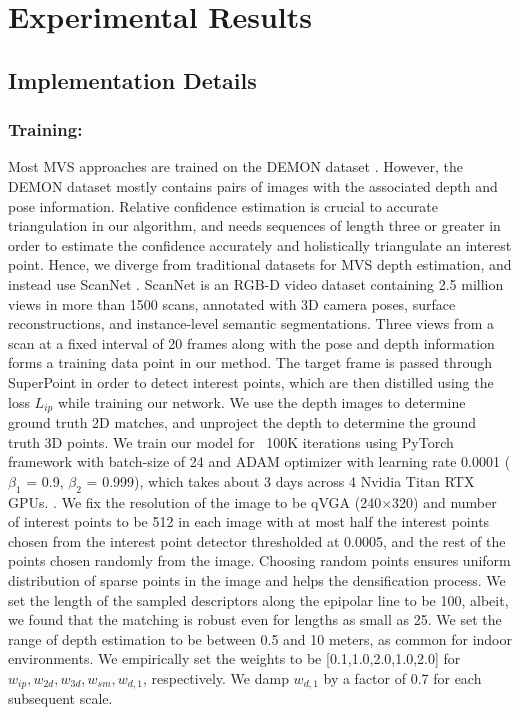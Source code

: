 \documentclass[runningheads]{llncs}
\begin{document}
\section{Experimental Results}

\subsection{Implementation Details}

\subsubsection{Training:} Most MVS approaches are trained on the DEMON dataset \cite{ummenhofer2017demon}. However, the DEMON dataset mostly contains pairs of images with the associated depth and pose information. Relative confidence estimation is crucial to accurate triangulation in our algorithm, and needs sequences of length three or greater in order to estimate the confidence accurately and holistically triangulate an interest point. Hence, we diverge from traditional datasets for MVS depth estimation, and instead use ScanNet \cite{dai2017scannet}. ScanNet is an RGB-D video dataset containing 2.5 million views in more than 1500 scans, annotated with 3D camera poses, surface reconstructions, and instance-level semantic segmentations. Three views from a scan at a fixed interval of 20 frames along with the pose and depth information forms a training data point in our method. The target frame is passed through SuperPoint in order to detect interest points, which are then distilled using the loss $L_{ip}$ while training our network. We use the depth images to determine ground truth 2D matches, and unproject the depth to determine the ground truth 3D points. We train our model for ~100K iterations using PyTorch framework with batch-size of 24 and ADAM optimizer with learning rate 0.0001 ($\beta_1$ = 0.9, $\beta_2$ = 0.999), which takes about 3 days across 4 Nvidia Titan RTX GPUs. . We fix the resolution of the image to be qVGA (240$\times$320) and number of interest points to be 512 in each image with at most half the interest points chosen from the interest point detector thresholded at 0.0005, and the rest of the points chosen randomly from the image. Choosing random points ensures uniform distribution of sparse points in the image and helps the densification process. We set the length of the sampled descriptors along the epipolar line to be 100, albeit, we found that the matching is robust even for lengths as small as 25. We set the range of depth estimation to be between 0.5 and 10 meters, as common for indoor environments. We empirically set the weights to be [0.1,1.0,2.0,1.0,2.0] for $w_{ip}, w_{2d}, w_{3d}, w_{sm}, w_{d,1}$, respectively. We damp $w_{d,1}$ by a factor of 0.7 for each subsequent scale. 
\end{document}
